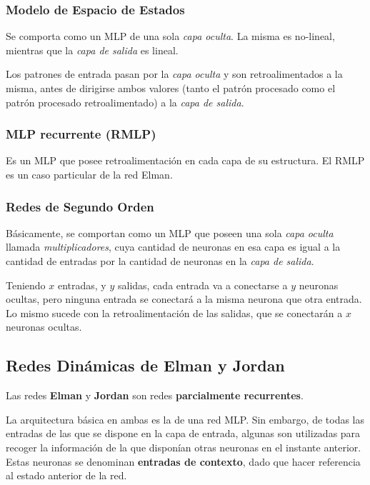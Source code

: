 \documentclass[10pt,a4paper]{article}
\begin{document}
\subsubsection{Modelo de Espacio de Estados}

Se comporta como un MLP de una sola \textit{capa oculta}. La misma es no-lineal, mientras que la \textit{capa de salida} es lineal.

Los patrones de entrada pasan por la \textit{capa oculta} y son retroalimentados a la misma, antes de dirigirse ambos valores (tanto el patrón procesado como el patrón procesado retroalimentado) a la \textit{capa de salida}.

\subsubsection{MLP recurrente (RMLP)}

Es un MLP que posee retroalimentación en cada capa de su estructura. El RMLP es un caso particular de la red Elman.

\subsubsection{Redes de Segundo Orden}

Básicamente, se comportan como un MLP que poseen una sola \textit{capa oculta} llamada \textit{multiplicadores}, cuya cantidad de neuronas en esa capa es igual a la cantidad de entradas por la cantidad de neuronas en la \textit{capa de salida}.

Teniendo $x$ entradas, y $y$ salidas, cada entrada va a conectarse a $y$ neuronas ocultas, pero ninguna entrada se conectará a la misma neurona que otra entrada. Lo mismo sucede con la retroalimentación de las salidas, que se conectarán a $x$ neuronas ocultas.

\subsection{Redes Dinámicas de Elman y Jordan}

Las redes \textbf{Elman} y \textbf{Jordan} son redes \textbf{parcialmente recurrentes}.

La arquitectura básica en ambas es la de una red MLP. Sin embargo, de todas las entradas de las que se dispone en la capa de entrada, algunas son utilizadas para recoger la información de la que disponían otras neuronas en el instante anterior. Estas neuronas se denominan \textbf{entradas de contexto}, dado que hacer referencia al estado anterior de la red.
\end{document}
